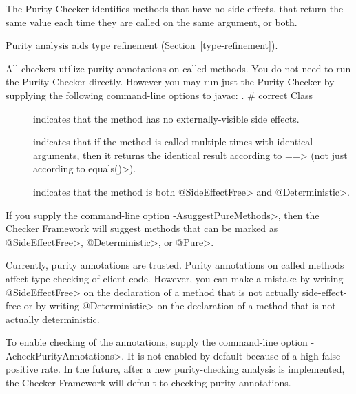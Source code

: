 \htmlhr
{}

The Purity Checker identifies methods that have no side effects, that
return the same value each time they are called on the same argument, or both.

Purity analysis aids type refinement (Section~\ref{type-refinement}).

All checkers utilize purity annotations on called methods.
You do not need to run the Purity Checker directly.
However you may run just the Purity Checker by
supplying the following command-line options to javac:
. # correct Class 



\begin{description}

\item[]
  indicates that the method has no externally-visible side effects.

\item[]
  indicates that if the method is called multiple times with identical
  arguments, then it returns the identical result according to \<==>
  (not just according to \<equals()>).

\item[]
  indicates that the method is both \<@SideEffectFree> and \<@Deterministic>.

\end{description}

If you supply the command-line option \<-AsuggestPureMethods>, then the
Checker Framework will suggest methods that can be marked as
\<@SideEffectFree>, \<@Deterministic>, or \<@Pure>.



Currently, purity annotations are trusted.  Purity annotations on called
methods affect type-checking of client code.  However, you can make a
mistake by writing \<@SideEffectFree> on the declaration of a method that
is not actually side-effect-free or by writing \<@Deterministic> on the
declaration of a method that is not actually deterministic.

To enable
checking of the annotations, supply the command-line option
\<-AcheckPurityAnnotations>.  It is not enabled by default because of a high false
positive rate.  In the future, after a new purity-checking analysis is
implemented, the Checker Framework will default to checking purity
annotations.



